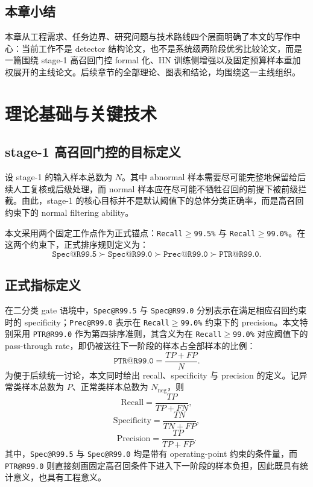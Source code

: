 \documentclass[UTF8,openany,12pt]{ctexbook}
\newcommand{\formalmetric}[1]{\texttt{#1}}
\begin{document}
\section{本章小结}
本章从工程需求、任务边界、研究问题与技术路线四个层面明确了本文的写作中心：当前工作不是 detector 结构论文，也不是系统级两阶段优劣比较论文，而是一篇围绕 stage-1 高召回门控 formal 化、HN 训练侧增强以及固定预算样本重加权展开的主线论文。后续章节的全部理论、图表和结论，均围绕这一主线组织。

\chapter{理论基础与关键技术}

\section{stage-1 高召回门控的目标定义}
设 stage-1 的输入样本总数为 $N$。其中 abnormal 样本需要尽可能完整地保留给后续人工复核或后级处理，而 normal 样本应在尽可能不牺牲召回的前提下被前级拦截。由此，stage-1 的核心目标并不是默认阈值下的总体分类正确率，而是高召回约束下的 normal filtering ability。

本文采用两个固定工作点作为正式锚点：\formalmetric{Recall$\geq$99.5\%} 与 \formalmetric{Recall$\geq$99.0\%}。在这两个约束下，正式排序规则定义为：
\begin{equation}
\formalmetric{Spec@R99.5} \succ \formalmetric{Spec@R99.0} \succ \formalmetric{Prec@R99.0} \succ \formalmetric{PTR@R99.0}.
\end{equation}

\section{正式指标定义}
在二分类 gate 语境中，\formalmetric{Spec@R99.5} 与 \formalmetric{Spec@R99.0} 分别表示在满足相应召回约束时的 specificity；\formalmetric{Prec@R99.0} 表示在 \formalmetric{Recall$\geq$99.0\%} 约束下的 precision。本文特别采用 \formalmetric{PTR@R99.0} 作为第四排序准则，其含义为在 \formalmetric{Recall$\geq$99.0\%} 对应阈值下的 pass-through rate，即仍被送往下一阶段的样本占全部样本的比例：
\begin{equation}
\formalmetric{PTR@R99.0} = \frac{TP + FP}{N}.
\end{equation}
为便于后续统一讨论，本文同时给出 recall、specificity 与 precision 的定义。记异常类样本总数为 $P$、正常类样本总数为 $N_{\mathrm{neg}}$，则
\begin{equation}
\mathrm{Recall} = \frac{TP}{TP + FN},
\end{equation}
\begin{equation}
\mathrm{Specificity} = \frac{TN}{TN + FP},
\end{equation}
\begin{equation}
\mathrm{Precision} = \frac{TP}{TP + FP}.
\end{equation}
其中，\formalmetric{Spec@R99.5} 与 \formalmetric{Spec@R99.0} 均是带有 operating-point 约束的条件量，而 \formalmetric{PTR@R99.0} 则直接刻画固定高召回条件下进入下一阶段的样本负担，因此既具有统计意义，也具有工程意义。
\end{document}
